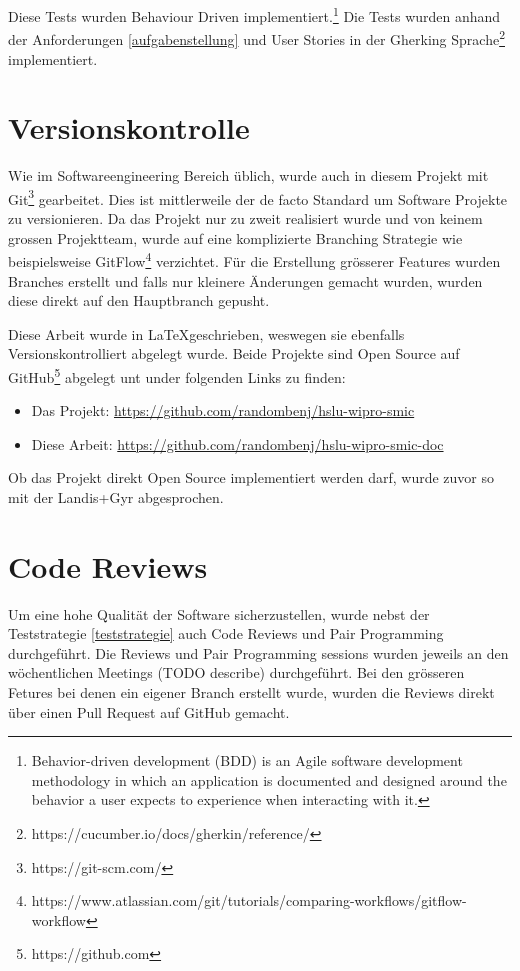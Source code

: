 Diese Tests wurden Behaviour Driven implementiert.\footnote{
    Behavior-driven development (BDD) is an Agile software development methodology
    in which an application is documented and designed around the behavior a user
    expects to experience when interacting with it.
} \parencite{what_is_bdd} Die Tests wurden anhand der Anforderungen \ref{aufgabenstellung}
und User Stories in der Gherking Sprache\footnote{https://cucumber.io/docs/gherkin/reference/} implementiert.

\section{Versionskontrolle}

Wie im Softwareengineering Bereich üblich, wurde auch in diesem Projekt mit Git\footnote{https://git-scm.com/}
gearbeitet. Dies ist mittlerweile der de facto Standard um Software Projekte zu versionieren. \parencite{git}
Da das Projekt nur zu zweit realisiert wurde und von keinem grossen Projektteam, wurde auf
eine komplizierte Branching Strategie wie beispielsweise
GitFlow\footnote{https://www.atlassian.com/git/tutorials/comparing-workflows/gitflow-workflow} verzichtet.
Für die Erstellung grösserer Features wurden Branches erstellt und falls nur kleinere
Änderungen gemacht wurden, wurden diese direkt auf den Hauptbranch gepusht.

Diese Arbeit wurde in \LaTeX geschrieben, weswegen sie ebenfalls Versionskontrolliert abgelegt wurde.
Beide Projekte sind Open Source auf GitHub\footnote{https://github.com} abgelegt unt under
folgenden Links zu finden:

\begin{itemize}
  \item Das Projekt: \url{https://github.com/randombenj/hslu-wipro-smic}
  \item Diese Arbeit: \url{https://github.com/randombenj/hslu-wipro-smic-doc}
\end{itemize}

Ob das Projekt direkt Open Source implementiert werden darf, wurde zuvor so mit der Landis+Gyr abgesprochen.

\section{Code Reviews}

Um eine hohe Qualität der Software sicherzustellen, wurde nebst der Teststrategie \ref{teststrategie}
auch Code Reviews und Pair Programming durchgeführt. \parencite{fu2017code}
Die Reviews und Pair Programming sessions wurden jeweils an den wöchentlichen
Meetings (TODO describe) durchgeführt.
Bei den grösseren Fetures bei denen ein eigener Branch erstellt wurde, wurden die
Reviews direkt über einen Pull Request auf GitHub gemacht. \parencite{github_flow_docs_2021}

